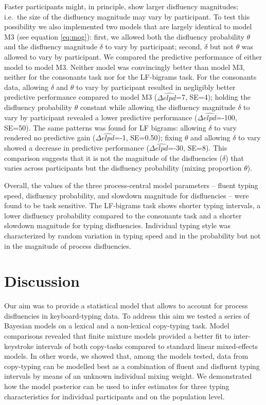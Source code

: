 \documentclass[
  english,
  man,mask,floatsintext]{apa7}
\begin{document}
Faster participants might, in principle, show larger disfluency magnitudes; i.e.~the size of the disfluency magnitude may vary by participant. To test this possibility we also implemented two models that are largely identical to model M3 (see equation \ref{eq:mog}): first, we allowed both the disfluency probability \(\theta\) and the disfluency magnitude \(\delta\) to vary by participant; second, \(\delta\) but not \(\theta\) was allowed to vary by participant. We compared the predictive performance of either model to model M3. Neither model was convincingly better than model M3, neither for the consonants task nor for the LF-bigrams task. For the consonants data, allowing \(\delta\) and \(\theta\) to vary by participant resulted in negligibly better predictive performance compared to model M3 (\(\Delta\widehat{elpd}\)=7, SE=4); holding the disfluency probability \(\theta\) constant while allowing the disfluency magnitude \(\delta\) to vary by participant revealed a lower predictive performance (\(\Delta\widehat{elpd}\)=-100, SE=50). The same patterns was found for LF bigrams: allowing \(\delta\) to vary rendered no predictive gain (\(\Delta\widehat{elpd}\)=-1, SE=0.50); fixing \(\theta\) and allowing \(\delta\) to vary showed a decrease in predictive performance (\(\Delta\widehat{elpd}\)=-30, SE=8). This comparison suggests that it is not the magnitude of the disfluencies (\(\delta\)) that varies across participants but the disfluency probability (mixing proportion \(\theta\)).

Overall, the values of the three process-central model parameters -- fluent typing speed, disfluency probability, and slowdown magnitude for disfluencies -- were found to be task sensitive. The LF-bigrams task shows shorter typing intervals, a lower disfluency probability compared to the consonants task and a shorter slowdown magnitude for typing disfluencies. Individual typing style was characterized by random variation in typing speed and in the probability but not in the magnitude of process disfluencies.

\hypertarget{discussion}{%
\section{Discussion}\label{discussion}}

Our aim was to provide a statistical model that allows to account for process disfluencies in keyboard-typing data. To address this aim we tested a series of Bayesian models on a lexical and a non-lexical copy-typing task. Model comparisons revealed that finite mixture models provided a better fit to inter-keystroke intervals of both copy-tasks compared to standard linear mixed-effects models. In other words, we showed that, among the models tested, data from copy-typing can be modelled best as a combination of fluent and disfluent typing intervals by means of an unknown individual mixing weight. We demonstrated how the model posterior can be used to infer estimates for three typing characteristics for individual participants and on the population level.
\end{document}
